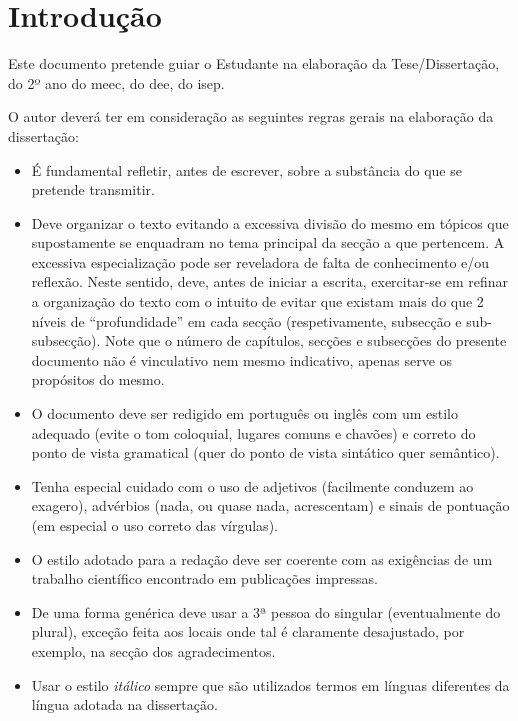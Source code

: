 
\chapter{Introdução} 	%
\label{Chapter1} 		%


Este documento pretende guiar o Estudante na elaboração da Tese/Dissertação, do 2º ano do \ac{meec}, do \ac{dee}, do \ac{isep}.

O autor deverá ter em consideração as seguintes regras gerais na elaboração da dissertação:

\begin{itemize}
	\item É fundamental refletir, antes de escrever, sobre a substância do que se pretende transmitir.
	\item Deve organizar o texto evitando a excessiva divisão do mesmo em tópicos que supostamente se enquadram no tema principal da secção a que pertencem. A excessiva especialização pode ser reveladora de falta de conhecimento e/ou reflexão. Neste sentido, deve, antes de iniciar a escrita, exercitar-se em refinar a organização do texto com o intuito de evitar que existam mais do que 2 níveis de ``profundidade'' em cada secção (respetivamente, subsecção e sub-subsecção). Note que o número de capítulos, secções e subsecções do presente documento não é vinculativo nem mesmo indicativo, apenas serve os propósitos do mesmo.
	\item O documento deve ser redigido em português ou inglês com um estilo adequado (evite o tom coloquial, lugares comuns e chavões) e correto do ponto de vista gramatical (quer do ponto de vista sintático quer semântico).
	\item Tenha especial cuidado com o uso de adjetivos (facilmente conduzem ao exagero), advérbios (nada, ou quase nada, acrescentam) e sinais de pontuação (em especial o uso correto das vírgulas).
	\item O estilo adotado para a redação deve ser coerente com as exigências de um trabalho científico encontrado em publicações impressas.
	\item De uma forma genérica deve usar a 3ª pessoa do singular (eventualmente do plural), exceção feita aos locais onde tal é claramente desajustado, por exemplo, na secção dos agradecimentos.
	\item Usar o estilo \textit{itálico} sempre que são utilizados termos em línguas diferentes da língua adotada na dissertação.

\end{itemize}
